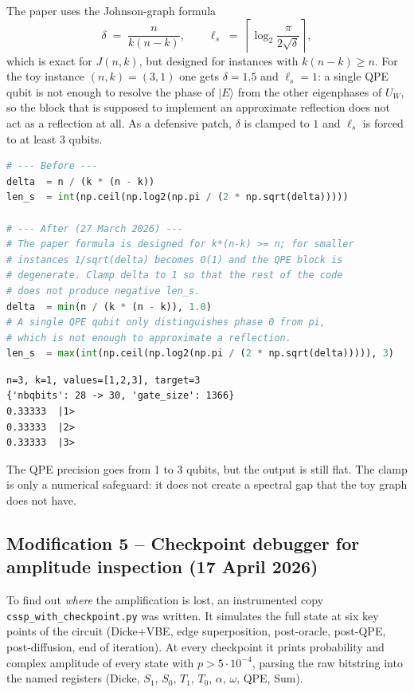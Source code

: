 \documentclass[11pt,a4paper]{article}
\begin{document}
The paper uses the Johnson-graph formula
\[
\delta \;=\; \frac{n}{k(n-k)},
\qquad
\ell_s \;=\; \left\lceil \log_2\!\frac{\pi}{2\sqrt{\delta}} \right\rceil,
\]
which is exact for $J(n,k)$, but designed for instances with
$k(n-k)\ge n$. For the toy instance $(n,k)=(3,1)$ one gets
$\delta=1.5$ and $\ell_s=1$: a single QPE qubit is not enough to
resolve the phase of $|E\rangle$ from the other eigenphases of $U_W$,
so the block that is supposed to implement an approximate reflection
does not act as a reflection at all. As a defensive patch, $\delta$
is clamped to $1$ and $\ell_s$ is forced to at least $3$ qubits.

\begin{lstlisting}[language=Python]
# --- Before ---
delta  = n / (k * (n - k))
len_s  = int(np.ceil(np.log2(np.pi / (2 * np.sqrt(delta)))))

# --- After (27 March 2026) ---
# The paper formula is designed for k*(n-k) >= n; for smaller
# instances 1/sqrt(delta) becomes O(1) and the QPE block is
# degenerate. Clamp delta to 1 so that the rest of the code
# does not produce negative len_s.
delta  = min(n / (k * (n - k)), 1.0)
# A single QPE qubit only distinguishes phase 0 from pi,
# which is not enough to approximate a reflection.
len_s  = max(int(np.ceil(np.log2(np.pi / (2 * np.sqrt(delta))))), 3)
\end{lstlisting}

\begin{lstlisting}[style=plain]
n=3, k=1, values=[1,2,3], target=3
{'nbqbits': 28 -> 30, 'gate_size': 1366}
0.33333  |1>
0.33333  |2>
0.33333  |3>
\end{lstlisting}

The QPE precision goes from 1 to 3 qubits, but the output is still
flat. The clamp is only a numerical safeguard: it does not create a
spectral gap that the toy graph does not have.

\subsection*{Modification 5 -- Checkpoint debugger for amplitude
inspection (17 April 2026)}

To find out \emph{where} the amplification is lost, an instrumented
copy \texttt{cssp\_with\_checkpoint.py} was written. It simulates the
full state at six key points of the circuit (Dicke+VBE, edge
superposition, post-oracle, post-QPE, post-diffusion, end of
iteration). At every checkpoint it prints probability and complex
amplitude of every state with $p>5\cdot 10^{-4}$, parsing the raw
bitstring into the named registers (Dicke, $S_1$, $S_0$, $T_1$,
$T_0$, $\alpha$, $\omega$, QPE, Sum).
\end{document}
